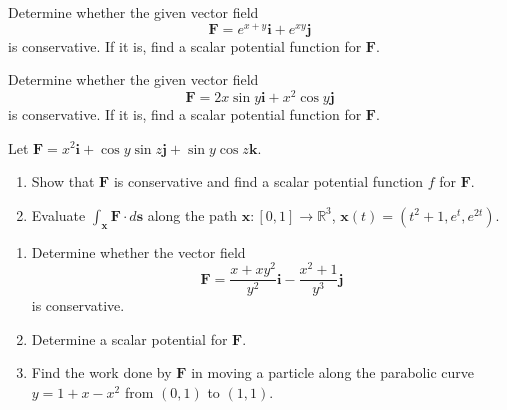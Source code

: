 \documentclass[11pt,letterpaper,boxed]{hmcpset}
\newcommand{\R}{\mathbb{R}}
\newcommand{\VEC}[1]{\ensuremath{\mathbf{#1}}\xspace}
\begin{document}
\begin{solution}
\vfill
\end{solution}
\newpage

\begin{problem}[Colley 6.3 \#3]
Determine whether the given vector field
\[
	\VEC{F} = e^{x+y}\VEC{i} + e^{xy}\VEC{j}
\]
is conservative. If it is, find a scalar potential function for $\VEC{F}$.
\end{problem}

\begin{solution}
\vfill
\end{solution}
\newpage

\begin{problem}[Colley 6.3 \#4]
Determine whether the given vector field
\[
	\VEC{F} = 2x\sin y\VEC{i} + x^2\cos y\VEC{j}
\]
is conservative. If it is, find a scalar potential function for $\VEC{F}$.
\end{problem}

\begin{solution}
\vfill
\end{solution}
\newpage

\begin{problem}[Colley 6.3 \#25]
Let $\VEC{F} = x^2\VEC{i} + \cos{y}\sin{z}	\VEC{j}+\sin{y}\cos{z}\VEC{k}$.
\begin{enumerate}
\item Show that $\VEC{F}$ is conservative and find a scalar potential function $f$ for $\VEC{F}$.
\item Evaluate $\int_{\VEC{x}}\VEC{F}\cdot d\VEC{s}$ along the path $\VEC{x}:[0,1]\rightarrow \R^3$, $\VEC{x}(t) = (t^2+1, e^t, e^{2t})$.
\end{enumerate}
\end{problem}

\begin{solution}
\vfill
\end{solution}
\newpage

\begin{problem}[Colley 6.3 \#33]
\begin{enumerate}
\item Determine whether the vector field
\[
	\VEC{F} = \frac{x+xy^2}{y^2}\VEC{i} - \frac{x^2+1}{y^3}\VEC{j}
\] 
is conservative.
\item Determine a scalar potential for $\VEC{F}$.
\item Find the work done by $\VEC{F}$ in moving a particle along the parabolic curve $y=1+x-x^2$ from $(0,1)$ to $(1,1)$.
\end{enumerate}
\end{problem}
\end{document}
